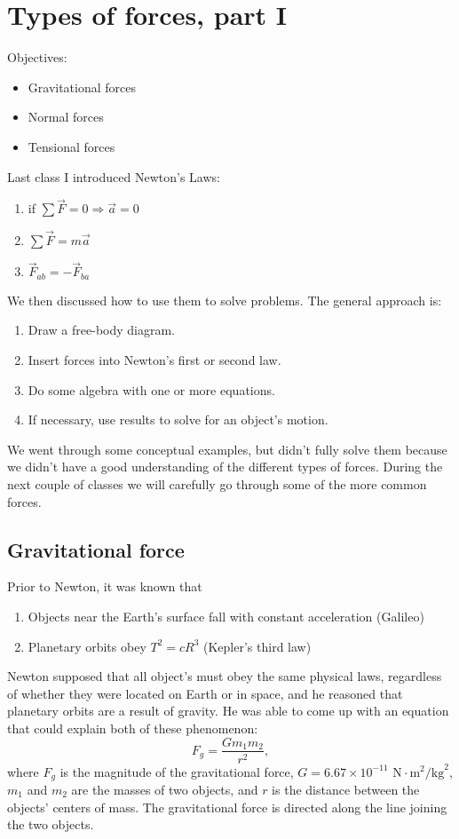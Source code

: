 \section{Types of forces, part I}
Objectives:
\begin{itemize}
\item Gravitational forces
\item Normal forces
\item Tensional forces
\end{itemize}

\hrulefill

Last class I introduced Newton's Laws:
\begin{enumerate}
\item if $\sum\vec{F}=0\Rightarrow \vec{a}=0$
\item $\sum\vec{F}=m\vec{a}$
\item $\vec{F}_{ab}=-\vec{F}_{ba}$
\end{enumerate}
We then discussed how to use them to solve problems. The general approach is:
\begin{enumerate}
\item Draw a free-body diagram.
\item Insert forces into Newton's first or second law.
\item Do some algebra with one or more equations.
\item If necessary, use results to solve for an object's motion.
\end{enumerate}
We went through some conceptual examples, but didn't fully solve them because we didn't have a good understanding of the different types of forces. During the next couple of classes we will carefully go through some of the more common forces.

\subsection{Gravitational force}
Prior to Newton, it was known that
\begin{enumerate}
\item Objects near the Earth's surface fall with constant acceleration (Galileo)
\item Planetary orbits obey $T^2=cR^3$ (Kepler's third law)
\end{enumerate}
Newton supposed that all object's must obey the same physical laws, regardless of whether they were located on Earth or in space, and he reasoned that planetary orbits are a result of gravity. He was able to come up with an equation that could explain both of these phenomenon:
$$\boxed{F_g=\frac{Gm_1m_2}{r^2}},$$
where $F_g$ is the magnitude of the gravitational force, $G=6.67\times10^{-11}\mbox{ N}\cdot\mbox{m}^2\mbox{/kg}^2$, $m_1$ and $m_2$ are the masses of two objects, and $r$ is the distance between the objects' centers of mass. The gravitational force is directed along the line joining the two objects.


